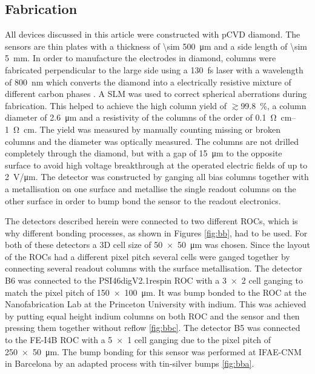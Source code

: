 \subsection{Fabrication}
All devices discussed in this article were constructed with \ac{pCVD} diamond. The sensors are thin plates with a thickness of \SI{\sim 500}{\um} and a side length of \SI{\sim 5}{\mm}. In order to manufacture the electrodes in diamond, columns were fabricated perpendicular to the large side using a \SI{130}{\femto\second} laser with a wavelength of \SI{800}{\nano\meter} which converts the diamond into a electrically resistive mixture of different carbon phases \cite{3dfab}. A \ac{SLM} \cite{slm} was used to correct spherical aberrations during fabrication. This helped to achieve the high column yield of $\gtrsim$\SI{ 99.8}{\%}, a column diameter of \SI{2.6}{\micro\meter} and a resistivity of the columns of the order of \SIrange{.1}{1}{\ohm\cm}. The yield was measured by manually counting missing or broken columns and the diameter was optically measured. The columns are not drilled completely through the diamond, but with a gap of \SI{15}{\micro\meter} to the opposite surface to avoid high voltage breakthrough at the operated electric fields of up to \SI{2}{\volt/\um}. The detector was constructed by ganging all bias columns together with a metallisation on one surface and metallise the single readout columns on the other surface in order to bump bond the sensor to the readout electronics.\par
The detectors described herein were connected to two different \acp{ROC}, which is why different bonding processes, as shown in Figures \ref{fig:bb}, had to be used. For both of these detectors a 3D cell size of \SI{50x50}{\micro\meter} was chosen. Since the layout of the \acp{ROC} had a different pixel pitch several cells were ganged together by connecting several readout columns with the surface metallisation. The detector B6 was connected to the PSI46digV2.1respin \ac{ROC} \cite{kornmayer} with a \SI{3x2}{} cell ganging to match the pixel pitch of \SI{150x100}{\micro\meter}. It was bump bonded to the \ac{ROC} at the Nanofabrication Lab at the Princeton University with indium. This was achieved by putting equal height indium columns on both \ac{ROC} and the sensor and then pressing them together without reflow \ref{fig:bbc}. The detector B5 was connected to the FE-I4B \ac{ROC} \cite{fei4} with a \SI{5x1}{} cell ganging due to the pixel pitch of \SI{250x50}{\micro\meter}. The bump bonding for this sensor was performed at IFAE-CNM in Barcelona by an adapted process with tin-silver bumps \ref{fig:bba}.\par
